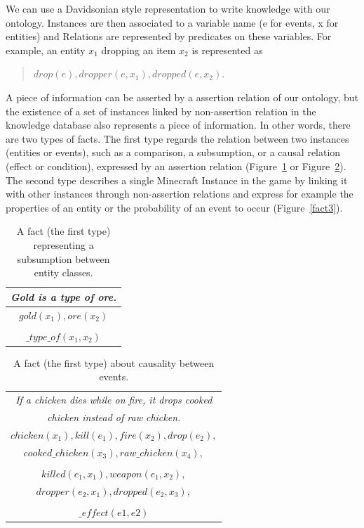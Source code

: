 \documentclass[12pt]{article}
\begin{document}
We can use a Davidsonian style representation to write knowledge with our ontology. Instances are then associated to a variable name (e for events, x for entities) and Relations are represented by predicates on these variables. For example, an entity $x_1$ dropping an item $x_2$ is represented as 
\begin{quote}
$drop(e), dropper(e, x_1), dropped(e, x_2)$.
\end{quote} 

A piece of information can be asserted by a assertion relation of our ontology, but the existence of a set of instances linked by non-assertion relation in the knowledge database also represents a piece of information. In other words, there are two types of facts. The first type regards the relation between two instances (entities or events), such as a comparison, a subsumption, or a causal relation (effect or condition), expressed by an assertion relation (Figure~\ref{fact1} or Figure~\ref{fact2}). The second type describes a single Minecraft Instance in the game by linking it with other instances through non-assertion relations and express for example the properties of an entity or the probability of an event to occur  (Figure~\ref{fact3}).

\begin{table}[!ht]
\center
\begin{tabular}{|c|}
\hline
\textit{Gold is a type of ore.}\\
\hline
\textit{$gold(x_1), ore(x_2)$}\\
\\
\textit{$\_type\_of(x_1,x_2)$}\\
\hline
\end{tabular}
\caption{\label{fact1} A fact (the first type) representing a subsumption between entity classes.}
\end{table}

\begin{table}[!ht]
\center
\begin{tabular}{|c|}
\hline
\textit{If a chicken dies while on fire, it drops cooked}\\
\textit{chicken instead of raw chicken.}\\
\hline
\textit{$chicken(x_1), kill(e_1), fire(x_2), drop(e_2),$}\\
\textit{$cooked\_chicken(x_3), raw\_chicken(x_4),$}\\
\\
\textit{$killed(e_1,x_1), weapon(e_1,x_2),$}\\
\textit{$dropper(e_2,x_1), dropped(e_2,x_3),$}\\
\\
\textit{$\_effect(e1,e2)$}\\
\hline
\end{tabular}
\caption{\label{fact2} A fact (the first type) about causality between events.}
\end{table}
\end{document}
